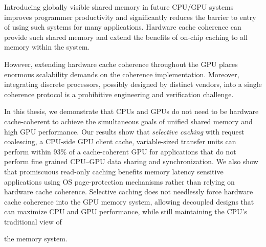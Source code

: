 
Introducing globally visible shared memory in future CPU/GPU systems
improves programmer productivity and significantly reduces the barrier
to entry of using such systems for many applications. 
Hardware cache coherence can provide such shared memory and
extend the benefits of on-chip caching to all memory within the system.
  However, extending hardware cache coherence 
throughout the GPU places enormous
scalability demands on the coherence implementation.  Moreover, integrating
discrete processors, possibly designed by distinct vendors,
into a single coherence protocol is a prohibitive engineering and
verification challenge.  

In this thesis, we demonstrate that CPUs and
GPUs do not need to be hardware cache-coherent to achieve the
simultaneous goals of unified shared memory and high GPU performance.  Our
results show that \textit{selective caching} with request coalescing,
a CPU-side GPU client cache, variable-sized transfer units
can perform within 93\% of a
cache-coherent GPU for applications that do not perform fine
grained CPU--GPU data sharing and synchronization. We also show that promiscuous
read-only caching benefits memory latency sensitive applications using
OS page-protection mechanisms rather than relying on hardware cache coherence.  Selective caching
does not needlessly force hardware cache coherence into the GPU memory system,
allowing decoupled designs that can maximize CPU and GPU performance, while
still maintaining the CPU's traditional view of the
memory system.\newpage
